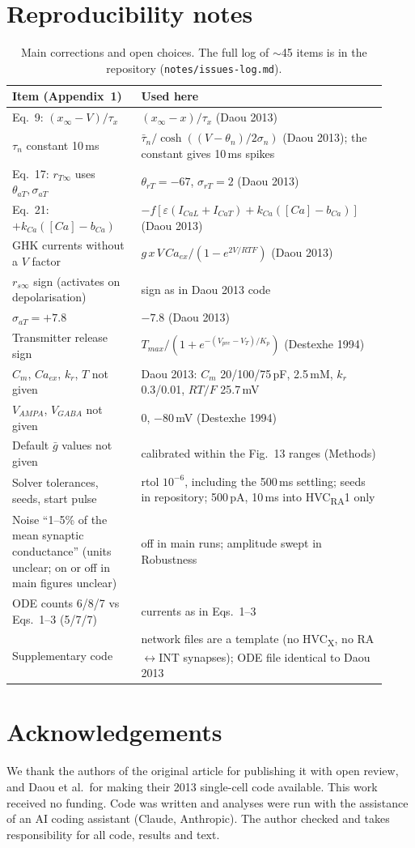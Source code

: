 \section*{Reproducibility notes}
\begin{table}[h]\small
\caption{Main corrections and open choices. The full log of $\sim$45 items is in the repository
(\texttt{notes/issues-log.md}).}
\label{tab:issues}
\begin{tabular}{p{0.32\linewidth}p{0.6\linewidth}}
\hline
Item (Appendix~1) & Used here \\ \hline
Eq.~9: $(x_\infty - V)/\tau_x$ & $(x_\infty - x)/\tau_x$ (Daou 2013) \\
$\tau_n$ constant 10\,ms & $\bar\tau_n/\cosh((V-\theta_n)/2\sigma_n)$ (Daou 2013); the constant gives 10\,ms spikes \\
Eq.~17: $r_{T\infty}$ uses $\theta_{aT},\sigma_{aT}$ & $\theta_{rT}=-67$, $\sigma_{rT}=2$ (Daou 2013) \\
Eq.~21: $+k_{Ca}([Ca]-b_{Ca})$ & $-f[\varepsilon(I_{CaL}+I_{CaT})+k_{Ca}([Ca]-b_{Ca})]$ (Daou 2013) \\
GHK currents without a $V$ factor & $g\,x\,V\,Ca_{ex}/(1-e^{2V/RTF})$ (Daou 2013) \\
$r_{s\infty}$ sign (activates on depolarisation) & sign as in Daou 2013 code \\
$\sigma_{aT}=+7.8$ & $-7.8$ (Daou 2013) \\
Transmitter release sign & $T_{max}/(1+e^{-(V_{pre}-V_T)/K_p})$ (Destexhe 1994) \\
$C_m$, $Ca_{ex}$, $k_r$, $T$ not given & Daou 2013: $C_m$ 20/100/75\,pF, 2.5\,mM, $k_r$ 0.3/0.01, $RT/F$ 25.7\,mV \\
$V_{AMPA}$, $V_{GABA}$ not given & 0, $-80$\,mV (Destexhe 1994) \\
Default $\bar g$ values not given & calibrated within the Fig.~13 ranges (Methods) \\
Solver tolerances, seeds, start pulse & rtol $10^{-6}$, including the 500\,ms settling; seeds in repository; 500\,pA, 10\,ms into HVC\textsubscript{RA}1 only \\
Noise ``1--5\% of the mean synaptic conductance'' (units unclear; on or off in main figures unclear) & off in main runs; amplitude swept in Robustness \\
ODE counts 6/8/7 vs Eqs.~1--3 (5/7/7) & currents as in Eqs.~1--3 \\
Supplementary code & network files are a template (no HVC\textsubscript{X}, no RA$\leftrightarrow$INT synapses); ODE file identical to Daou 2013 \\ \hline
\end{tabular}
\end{table}

\section*{Acknowledgements}
We thank the authors of the original article for publishing it with open review, and Daou et
al.\ for making their 2013 single-cell code available. This work received no funding. Code was
written and analyses were run with the assistance of an AI coding assistant (Claude, Anthropic).
The author checked and takes responsibility for all code, results and text.

